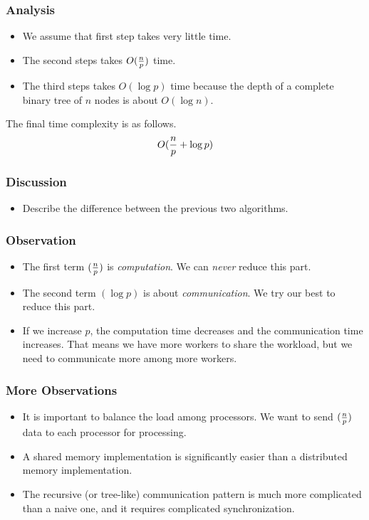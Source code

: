 \documentclass{beamer}
\begin{document}
\begin{CJK}{UTF8}{bsmi}
\begin{frame}
\frametitle{Analysis}
\begin{itemize}
\item We assume that first step takes very little time.
\item The second steps takes $O({n \over p})$ time.
\item The third steps takes $O(\log p)$ time because the depth of a complete binary tree of $n$ nodes is about $O(\log n)$.
\end{itemize}
The final time complexity is as follows.
\begin{equation}
O({n \over p} + \log p)
\end{equation}
\end{frame}

\begin{frame}
\frametitle{Discussion}
\begin{itemize}
\item Describe the difference between the previous two algorithms.
\end{itemize}
\end{frame}

\begin{frame}
\frametitle{Observation}
\begin{itemize}
\item The first term $({n \over p})$ is {\em computation}.  
We can {\em never} reduce this part.
\item The second term $(\log p)$ is about {\em communication}.  
We try our best to reduce this part.
\item If we increase $p$, the computation time decreases and the communication time increases.  
That means we have more workers to share the workload, but we need to communicate more among more workers.
\end{itemize}
\end{frame}

\begin{frame}
\frametitle{More Observations}
\begin{itemize}
\item It is important to balance the load among processors.
We want to send $({n \over p})$ data to each processor for processing.
\item A shared memory implementation is significantly easier than a distributed memory implementation.
\item The recursive (or tree-like) communication pattern is much more complicated than a naive one, and it requires complicated synchronization.
\end{itemize}
\end{frame}


\end{CJK}
\end{document}
